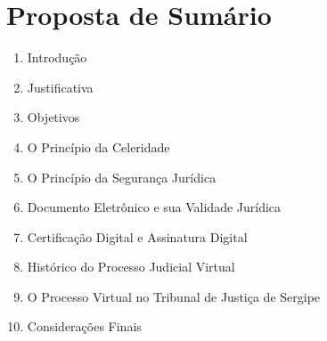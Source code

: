 \chapter{Proposta de Sumário}

\begin{enumerate}
    \item Introdução
    \item Justificativa
    \item Objetivos
    \item O Princípio da Celeridade
    \item O Princípio da Segurança Jurídica
    \item Documento Eletrônico e sua Validade Jurídica
    \item Certificação Digital e Assinatura Digital
    \item Histórico do Processo Judicial Virtual
    \item O Processo Virtual no Tribunal de Justiça de Sergipe
    \item Considerações Finais
\end{enumerate}
